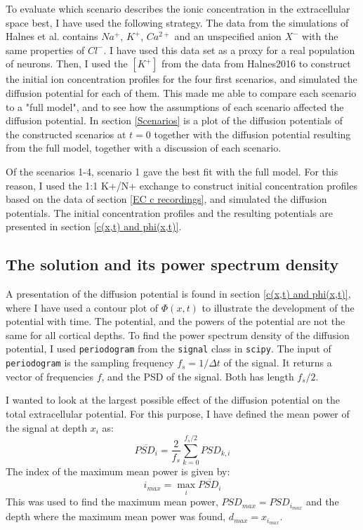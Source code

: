 \documentclass{article}
\begin{document}
To evaluate which scenario describes the ionic concentration in the extracellular space best, I have used the following strategy. 
The data from the  simulations of Halnes et al. \cite{Halnes2016} contains $Na^+$, $K^+$, $Ca^{2+}$ and an unspecified anion $X^-$ with the same properties of $Cl^-$. I have used this data set as a proxy for a real population of neurons. Then, I used the $[K^+]$ from the data from Halnes2016 to construct the initial ion concentration profiles for the four first scenarios, and simulated the diffusion potential for each of them. This made me able to compare each scenario to a "full model", and to see how the assumptions of each scenario affected the diffusion potential. In section \ref{Scenarios} is a plot of the diffusion potentials of the constructed scenarios at $t=0$ together with the diffusion potential resulting from the full model, together with a discussion of each scenario. 

Of the scenarios 1-4, scenario 1 gave the best fit with the full model. For this reason, I used the 1:1 K+/N+ exchange to construct initial concentration profiles based on the data of section \ref{EC c recordings}, and simulated the diffusion potentials. The  initial concentration profiles and the resulting potentials are presented in section \ref{c(x,t) and phi(x,t)}.

\subsection{The solution and its power spectrum density}\label{PSD of solution}
A presentation of the diffusion potential is found in section \ref{c(x,t) and phi(x,t)}, where I have used a contour plot of $\Phi(x,t)$ to illustrate the development of the potential with time. The potential, and the powers of the potential are not the same for all cortical depths.
To find the power spectrum density of the diffusion potential, I used \texttt{periodogram}  from the \texttt{signal} class in \texttt{scipy}. The input of \texttt{periodogram} is the sampling frequency $f_s = 1/\Delta t$ of the signal. It returns a vector of frequencies $f$, and the PSD of the signal. Both has length $f_s/2$. 

I wanted to look at the largest possible effect of the diffusion potential on the total extracellular potential. For this purpose, I have defined the mean power of the signal at depth $x_i$ as: 
 \begin{equation}
\overline{PSD_i} = \frac{2}{f_s} \sum_{k=0}^{f_s/2} PSD_{k,i}
 \end{equation}
The index of the maximum mean power is given by:
\begin{equation}
i_{max} = \max_i \overline{PSD_i}
\end{equation}
This was used to find the maximum mean power, $PSD_{max} = PSD_{i_{max}}$ and the depth where the maximum mean power was found, $d_{max} = x_{i_{max}}$.
\end{document}
